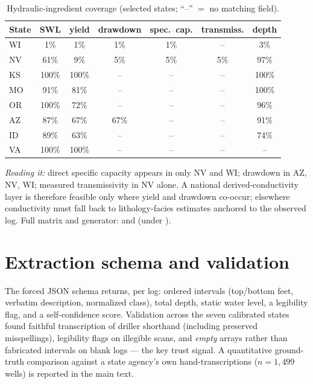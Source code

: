 \documentclass[12pt]{article}
\begin{document}
\begin{table}[h]\centering\footnotesize
\caption{Hydraulic-ingredient coverage (selected states; ``--'' $=$ no matching field).}
\label{tab:hydraulics}
\begin{tabular}{l c c c c c c}
\toprule
State & SWL & yield & drawdown & spec.\ cap. & transmiss. & depth \\
\midrule
WI & 1\% & 1\% & 1\% & 1\% & -- & 3\% \\
NV & 61\% & 9\% & 5\% & 5\% & 5\% & 97\% \\
KS & 100\% & 100\% & -- & -- & -- & 100\% \\
MO & 91\% & 81\% & -- & -- & -- & 100\% \\
OR & 100\% & 72\% & -- & -- & -- & 96\% \\
AZ & 87\% & 67\% & 67\% & -- & -- & 91\% \\
ID & 89\% & 63\% & -- & -- & -- & 74\% \\
VA & 100\% & 100\% & -- & -- & -- & -- \\
\bottomrule
\end{tabular}
\end{table}

\noindent\emph{Reading it:} direct specific capacity appears in only NV and WI; drawdown in AZ, NV, WI;
measured transmissivity in NV alone. A national derived-conductivity layer is therefore feasible only where
yield and drawdown co-occur; elsewhere conductivity must fall back to lithology-facies estimates anchored to
the observed log. Full matrix and generator:  and
 (under ).

\section{Extraction schema and validation}
The forced JSON schema returns, per log: ordered intervals (top/bottom feet, verbatim description,
normalized class), total depth, static water level, a legibility flag, and a self-confidence score.
Validation across the seven calibrated states found faithful transcription of driller shorthand
(including preserved misspellings), legibility flags on illegible scans, and \emph{empty} arrays rather
than fabricated intervals on blank logs --- the key trust signal. A quantitative ground-truth comparison
against a state agency's own hand-transcriptions ($n=1{,}499$ wells) is reported in the main text.

\end{document}
